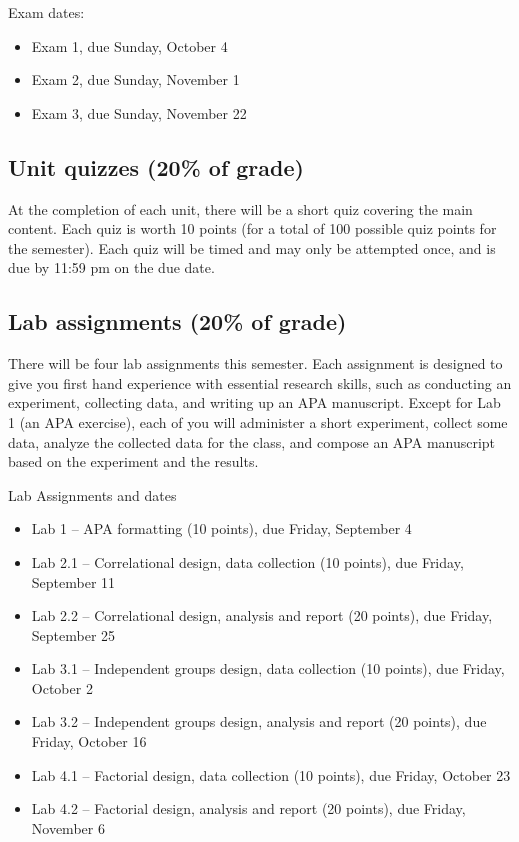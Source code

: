 \documentclass[10pt]{article}
\begin{document}
Exam dates:

\begin{itemize}
\item Exam 1, due Sunday, October 4
\item Exam 2, due Sunday, November 1
\item Exam 3, due Sunday, November 22
\end{itemize}

\subsection*{Unit quizzes (20\% of grade)}
\label{sec:org50b461c}

At the completion of each unit, there will be a short quiz covering the main content.  Each quiz is worth 10 points (for a total of 100 possible quiz points for the semester).  Each quiz will be timed and may only be attempted once, and is due by 11:59 pm on the due date.

\subsection*{Lab assignments (20\% of grade)}
\label{sec:orgbafc915}

There will be four lab assignments this semester.  Each assignment is designed to give you first hand experience with essential research skills, such as conducting an experiment, collecting data, and writing up an APA manuscript.  Except for Lab 1 (an APA exercise), each of you will administer a short experiment, collect some data, analyze the collected data for the class, and compose an APA manuscript based on the experiment and the results. 

Lab Assignments and dates

\begin{itemize}
\item Lab 1 – APA formatting (10 points), due Friday, September 4
\item Lab 2.1 – Correlational design, data collection (10 points), due Friday, September 11
\item Lab 2.2 – Correlational design, analysis and report (20 points), due Friday, September 25
\item Lab 3.1 – Independent groups design, data collection (10 points), due Friday, October 2
\item Lab 3.2 – Independent groups design, analysis and report (20 points), due Friday, October 16
\item Lab 4.1 – Factorial design, data collection (10 points), due Friday, October 23
\item Lab 4.2 – Factorial design, analysis and report (20 points), due Friday, November 6
\end{itemize}
\end{document}
